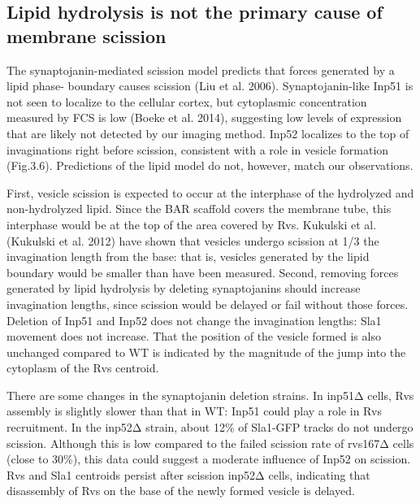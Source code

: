 \subsection{Lipid hydrolysis is not the primary cause of membrane scission}
The synaptojanin-mediated scission model predicts that forces generated by a lipid phase- boundary causes scission (Liu et al. 2006). Synaptojanin-like Inp51 is not seen to localize to the cellular cortex, but cytoplasmic concentration measured by FCS is low (Boeke et al. 2014), suggesting low levels of expression that are likely not detected by our imaging method. Inp52 localizes to the top of invaginations right before scission, consistent with a role in vesicle formation (Fig.3.6). Predictions of the lipid model do not, however, match our observations. 

\vspace{5mm}

First, vesicle scission is expected to occur at the interphase of the hydrolyzed and non-hydrolyzed lipid. Since the BAR scaffold covers the membrane tube, this interphase would be at the top of the area covered by Rvs. Kukulski et al. (Kukulski et al. 2012) have shown that vesicles undergo scission at 1/3 the invagination length from the base: that is, vesicles generated by the lipid boundary would be smaller than have been measured. Second, removing forces generated by lipid hydrolysis by deleting synaptojanins should increase invagination lengths, since scission would be delayed or fail without those forces. Deletion of Inp51 and Inp52 does not change the invagination lengths: Sla1 movement does not increase. That the position of the vesicle formed is also unchanged compared to WT is indicated by the magnitude of the jump into the cytoplasm of the Rvs centroid. 

\vspace{5mm}

There are some changes in the synaptojanin deletion strains. In inp51Δ cells, Rvs assembly is slightly slower than that in WT: Inp51 could play a role in Rvs recruitment. In the inp52Δ strain, about 12\% of Sla1-GFP tracks do not undergo scission. Although this is low compared to the failed scission rate of rvs167Δ cells (close to 30\%), this data could suggest a moderate influence of Inp52 on scission. Rvs and Sla1 centroids persist after scission inp52Δ cells, indicating that disassembly of Rvs on the base of the newly formed vesicle is delayed.

\vspace{5mm}

